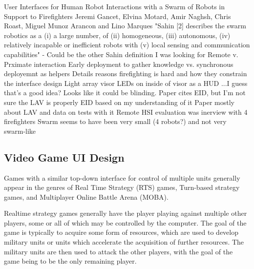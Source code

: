 \citep{gancet2010user}
User Interfaces for Human Robot Interactions with a Swarm of Robots in Support to Firefighters
Jeremi Gancet, Elvina Motard, Amir Naghsh, Chris Roast, Miguel Munoz Arancon and Lino Marques
	"Sahin [2] describes the swarm robotics as a (i) a large number, of (ii) homogeneous, (iii) autonomous, (iv) relatively incapable or inefficient robots with (v) local sensing and communication capabilities" - Could be the other Sahin definition I was looking for
	Remote v. Prximate interaction
	Early deployment to gather knowledge vs. synchronous deployemnt as helpers
	Details reasons firefighting is hard and how they constrain the interface design
	Light array visor
		LEDs on inside of visor as a HUD
		...I guess that's a good idea? Looks like it could be blinding.
	Paper cites EID, but I'm not sure the LAV is properly EID based on my understanding of it
	Paper mostly about LAV and data on tests with it
		Remote HSI evaluation was inerview with 4 firefighters
		Swarm seems to have been very small (4 robots?) and not very swarm-like


\subsection{Video Game UI Design}



Games with a similar top-down interface for control of multiple units generally appear in the genres of Real Time Strategy (RTS) games, Turn-based strategy games, and Multiplayer Online Battle Arena (MOBA). 

Realtime strategy games generally have the player playing against multiple other players, some or all of which may be controlled by the computer. 
The goal of the game is typically to acquire some form of resources, which are used to develop military units or units which accelerate the acquisition of further resources. 
The military units are then used to attack the other players, with the goal of the game being to be the only remaining player. 

